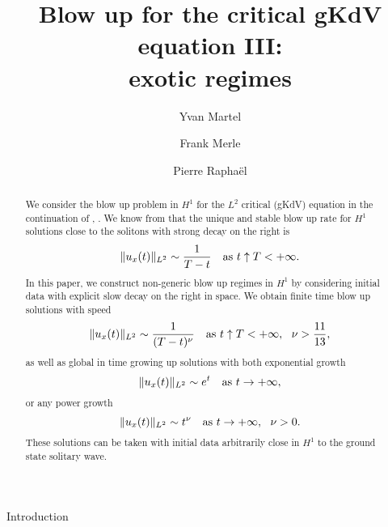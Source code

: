 \documentclass[11pt,a4paper,reqno]{amsart}
\title[Blow up for the critical gKdV III]{Blow up for the critical gKdV equation III: \\
exotic regimes}
\author[Y. Martel]{Yvan Martel}
\author[F. Merle]{Frank Merle}
\author[P. Rapha\"el]{Pierre Rapha\"el}
\makeatletter
\theoremstyle{remark}
\numberwithin{equation}{section}
\def\section{\@startsection{section}{1}%
  \z@{1.5\linespacing\@plus\linespacing}{.5\linespacing}%
  {\normalfont\bfseries\large\centering}}
\makeatother
\begin{document}
\begin{abstract}
We consider the blow up problem in $H^1$ for the $L^2$ critical (gKdV) equation in the continuation of \cite{MMR1}, \cite{MMR2}.
We know from \cite{MMR1} that the unique and stable blow up rate for $H^1$ solutions close to the solitons with strong decay on the right is $$\|u_x(t)\|_{L^2} \sim\frac{1}{T-t}   \quad \hbox{as $t\uparrow T<+\infty$}.$$ 
In this paper,  we construct non-generic blow up regimes in $H^1$  by considering initial data with explicit slow  decay on the right in space. We obtain finite time blow up solutions with speed
$$
\|u_x(t)\|_{L^2} \sim \frac{1}{(T-t)^\nu} \quad \hbox{as $t\uparrow T<+\infty$}, \ \ \nu>\frac{11}{13},
$$
as well as global in time growing up solutions with both exponential growth $$
\|u_x(t)\|_{L^2} \sim e^{t} \quad \hbox{as $t\to +\infty$},
$$
or any power growth
$$
\|u_x(t)\|_{L^2} \sim t^{\nu} \quad \hbox{as $t\to +\infty$}, \ \ \nu>0.
$$
These solutions can be taken with initial data arbitrarily close in $H^1$ to the ground state solitary wave.
\end{abstract}

\maketitle
\section{Introduction}
\end{document}
